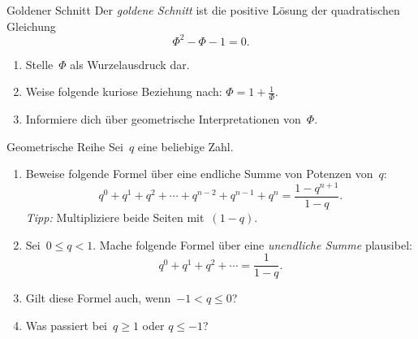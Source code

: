 \documentclass{zirkelblatt}
\begin{document}

\begin{aufgabe}{Goldener Schnitt}
Der \emph{goldene Schnitt} ist die positive Lösung der quadratischen Gleichung
\[ \Phi^2 - \Phi - 1 = 0. \]
\begin{enumerate}
\item Stelle~$\Phi$ als Wurzelausdruck dar.
\item Weise folgende kuriose Beziehung nach: $\Phi = 1 + \frac{1}{\Phi}$.
\item Informiere dich über geometrische Interpretationen von~$\Phi$.
\end{enumerate}
\end{aufgabe}

\begin{aufgabe}{Geometrische Reihe}
Sei~$q$ eine beliebige Zahl.
\begin{enumerate}
\item Beweise folgende Formel über eine endliche Summe von Potenzen von~$q$:
\[ q^0 + q^1 + q^2 + \cdots + q^{n-2} + q^{n-1} + q^n = \frac{1 - q^{n+1}}{1 -
q}. \]
\emph{Tipp:} Multipliziere beide Seiten mit~$(1-q)$.

\item Sei~$0 \leq q < 1$. Mache folgende Formel über eine \emph{unendliche
Summe} plausibel:
\[ q^0 + q^1 + q^2 + \cdots = \frac{1}{1 - q}. \]

\item Gilt diese Formel auch, wenn~$-1 < q \leq 0$?

\item Was passiert bei~$q \geq 1$ oder $q \leq -1$?
\end{enumerate}
\end{aufgabe}

\end{document}
